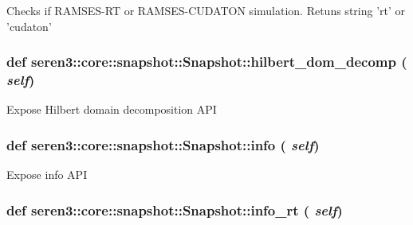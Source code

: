 \label{classseren3_1_1core_1_1snapshot_1_1Snapshot_a51e47a3904099f9ae123f172651aeafa}
\begin{DoxyVerb}
Checks if RAMSES-RT or RAMSES-CUDATON simulation.
Retuns string 'rt' or 'cudaton'
\end{DoxyVerb}
 \hypertarget{classseren3_1_1core_1_1snapshot_1_1Snapshot_a8f8db0d344f50929848d86464953ef24}{
\subsubsection[{hilbert\_\-dom\_\-decomp}]{\setlength{\rightskip}{0pt plus 5cm}def seren3::core::snapshot::Snapshot::hilbert\_\-dom\_\-decomp ( {\em self})}}
\label{classseren3_1_1core_1_1snapshot_1_1Snapshot_a8f8db0d344f50929848d86464953ef24}
\begin{DoxyVerb}
Expose Hilbert domain decomposition API
\end{DoxyVerb}
 \hypertarget{classseren3_1_1core_1_1snapshot_1_1Snapshot_a35e00e0ae62f607a535bb9952c4b05f3}{
\subsubsection[{info}]{\setlength{\rightskip}{0pt plus 5cm}def seren3::core::snapshot::Snapshot::info ( {\em self})}}
\label{classseren3_1_1core_1_1snapshot_1_1Snapshot_a35e00e0ae62f607a535bb9952c4b05f3}
\begin{DoxyVerb}
Expose info API
\end{DoxyVerb}
 \hypertarget{classseren3_1_1core_1_1snapshot_1_1Snapshot_aec49b53cd9a06089c35b19d78a70ce68}{
\subsubsection[{info\_\-rt}]{\setlength{\rightskip}{0pt plus 5cm}def seren3::core::snapshot::Snapshot::info\_\-rt ( {\em self})}}
\label{classseren3_1_1core_1_1snapshot_1_1Snapshot_aec49b53cd9a06089c35b19d78a70ce68}
